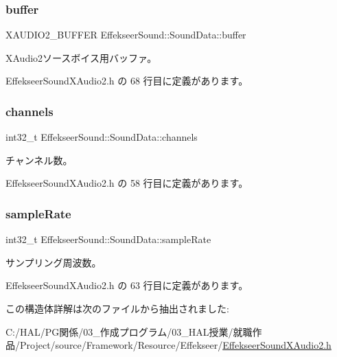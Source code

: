 \subsubsection{\texorpdfstring{buffer}{buffer}}
{\footnotesize\ttfamily X\+A\+U\+D\+I\+O2\+\_\+\+B\+U\+F\+F\+ER Effekseer\+Sound\+::\+Sound\+Data\+::buffer}



X\+Audio2ソースボイス用バッファ。 



 Effekseer\+Sound\+X\+Audio2.\+h の 68 行目に定義があります。

\mbox{\label{struct_effekseer_sound_1_1_sound_data_a6ce06a2fb5016cc2664b525ace949423}} 
\subsubsection{\texorpdfstring{channels}{channels}}
{\footnotesize\ttfamily int32\+\_\+t Effekseer\+Sound\+::\+Sound\+Data\+::channels}



チャンネル数。 



 Effekseer\+Sound\+X\+Audio2.\+h の 58 行目に定義があります。

\mbox{\label{struct_effekseer_sound_1_1_sound_data_a32d83df2626bbfbeafa1f6ebe72d9516}} 
\subsubsection{\texorpdfstring{sample\+Rate}{sampleRate}}
{\footnotesize\ttfamily int32\+\_\+t Effekseer\+Sound\+::\+Sound\+Data\+::sample\+Rate}



サンプリング周波数。 



 Effekseer\+Sound\+X\+Audio2.\+h の 63 行目に定義があります。



この構造体詳解は次のファイルから抽出されました\+:\begin{DoxyCompactItemize}
\item 
C\+:/\+H\+A\+L/\+P\+G関係/03\+\_\+作成プログラム/03\+\_\+\+H\+A\+L授業/就職作品/\+Project/source/\+Framework/\+Resource/\+Effekseer/\mbox{\hyperlink{_effekseer_sound_x_audio2_8h}{Effekseer\+Sound\+X\+Audio2.\+h}}\end{DoxyCompactItemize}

